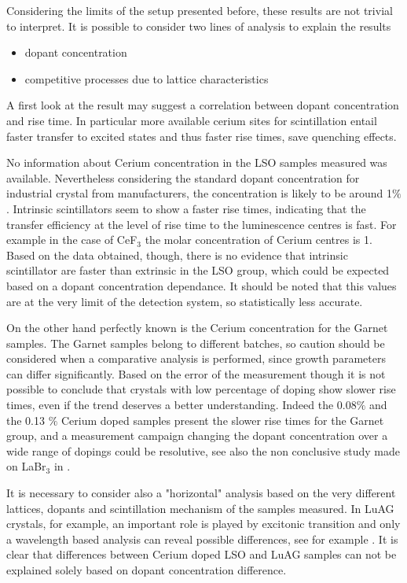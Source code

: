 Considering the limits of the setup presented before, these results are not trivial to interpret.
It is possible to consider two lines of analysis to explain the results 
\begin{itemize}
\item dopant concentration
\item competitive processes due to lattice characteristics
\end{itemize}
A first look at the result may suggest a correlation between dopant concentration and rise time. In particular more available cerium sites for scintillation entail faster transfer to excited states and thus faster rise times, save quenching effects.

No information about Cerium concentration in the LSO samples measured was available. Nevertheless considering the standard dopant concentration for industrial crystal from manufacturers, the concentration is likely to be around 1$\%$. 
Intrinsic scintillators seem to show a faster rise times, indicating that the transfer efficiency at the level of rise time to the luminescence centres is fast. For example in the case of CeF$_{3}$ the molar concentration of Cerium centres is 1. Based on the data obtained, though, there is no evidence that intrinsic scintillator are faster than extrinsic in the LSO group, which could be expected based on a dopant concentration dependance. It should be noted that this values are at the very limit of the detection system, so statistically less accurate.

On the other hand perfectly known is the Cerium concentration for the Garnet samples. 
The Garnet samples belong to different batches, so caution should be considered when a comparative analysis is performed, since growth parameters can differ significantly. Based on the error of the measurement though it is not possible to conclude that crystals with low percentage of doping show slower rise times, even if the trend deserves a better understanding. Indeed the 0.08$\%$ and the 0.13 $\%$ Cerium doped samples present the slower rise times for the Garnet group, and a measurement campaign changing the dopant concentration over a wide range of dopings could be resolutive, see also the non conclusive study made on LaBr$_{3}$ in \cite{Moses2004}.

It is necessary to consider also a "horizontal" analysis based on the very different lattices, dopants and scintillation mechanism of the samples measured. In LuAG crystals, for example, an important role is played by excitonic transition and only a wavelength based analysis can reveal possible differences, see for example \cite{Belsky2013}.
It is clear that differences between Cerium doped LSO and LuAG samples can not be explained solely based on dopant concentration difference.

